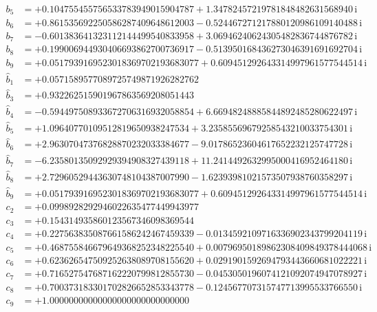 {\begin{align*}
b_{5} &= +0.104755455756533783949015904787 + 1.34782457219781848482631568940\,\mathrm{i}\\
b_{6} &= +0.861535692250586287409648612003 - 0.524467271217880120986109140488\,\mathrm{i}\\
b_{7} &= -0.601383641323112144499540833958 + 3.06946240624305482836744876782\,\mathrm{i}\\
b_{8} &= +0.199006944930406693862700736917 - 0.513950168436273046391691692704\,\mathrm{i}\\
b_{9} &= +0.0517939169523018369702193683077 + 0.609451292643314997961577544514\,\mathrm{i}\\[1mm]
\hat b_{1} &= +0.0571589577089725749871926282762\\
\hat b_{3} &= +0.932262515901967863569208051443\\
\hat b_{4} &= -0.594497508933672706316932058854 + 6.66948248885844892485280622497\,\mathrm{i}\\
\hat b_{5} &= +1.09640770109512819650938247534 + 3.23585569679258543210033754301\,\mathrm{i}\\
\hat b_{6} &= +2.96307047376828870232033384677 - 9.01786523604617652232125747728\,\mathrm{i}\\
\hat b_{7} &= -6.23580135092929394908327439118 + 11.2414492632995000416952464180\,\mathrm{i}\\
\hat b_{8} &= +2.72960529443630748104387007990 - 1.62393981021573507938760358297\,\mathrm{i}\\
\hat b_{9} &= +0.0517939169523018369702193683077 + 0.609451292643314997961577544514\,\mathrm{i}\\[1mm]
c_{2} &= +0.0998928292946022635477449943977\\
c_{3} &= +0.154314935860123567346098369544\\
c_{4} &= +0.227563835087661586242467459339 - 0.0134592109716336902343799204119\,\mathrm{i}\\
c_{5} &= +0.468755846679649368252348225540 + 0.00796950189862308409849378444068\,\mathrm{i}\\
c_{6} &= +0.623626547509252638089708155620 + 0.0291901592694793443660681022221\,\mathrm{i}\\
c_{7} &= +0.716527547687162220799812855730 - 0.0453050196074121092074947078927\,\mathrm{i}\\
c_{8} &= +0.700373183301702826652853343778 - 0.124567707315747713995533766550\,\mathrm{i}\\
c_{9} &= +1.00000000000000000000000000000
\end{align*}
}

